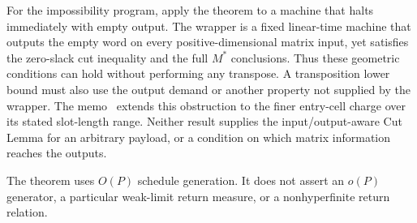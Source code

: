 For the impossibility program, apply the theorem to a machine that halts
immediately with empty output. The wrapper is a fixed linear-time machine
that outputs the empty word on every positive-dimensional matrix input,
yet satisfies the zero-slack cut inequality and the full $M^*$ conclusions.
Thus these geometric conditions can hold without performing any transpose.
A transposition lower bound must also use the output demand or another
property not supplied by the wrapper. The memo~\cite{PaddingMemo2026}
extends this obstruction to the finer entry-cell charge over its stated
slot-length range. Neither result supplies the input/output-aware Cut Lemma
for an arbitrary payload, or a condition on which matrix information reaches
the outputs.

The theorem uses $O(P)$ schedule generation. It does not assert an $o(P)$
generator, a particular weak-limit return measure, or a nonhyperfinite return
relation.
